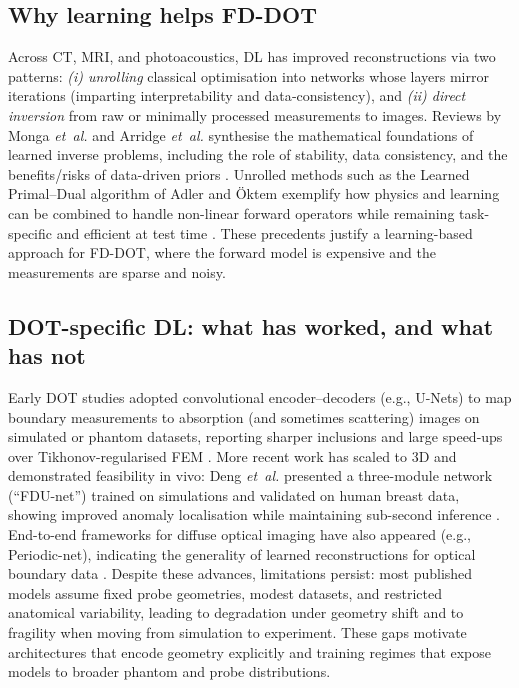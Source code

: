 \subsection{Why learning helps FD-DOT}
Across CT, MRI, and photoacoustics, DL has improved reconstructions via two patterns: \emph{(i) unrolling} classical optimisation into networks whose layers mirror iterations (imparting interpretability and data‐consistency), and \emph{(ii) direct inversion} from raw or minimally processed measurements to images. Reviews by Monga \emph{et~al.} and Arridge \emph{et~al.} synthesise the mathematical foundations of learned inverse problems, including the role of stability, data consistency, and the benefits/risks of data-driven priors \cite{monga2021, arridge2019}. Unrolled methods such as the Learned Primal–Dual algorithm of Adler and Öktem exemplify how physics and learning can be combined to handle non-linear forward operators while remaining task-specific and efficient at test time \cite{adler2018}. These precedents justify a learning-based approach for FD-DOT, where the forward model is expensive and the measurements are sparse and noisy.

\subsection{DOT-specific DL: what has worked, and what has not}
Early DOT studies adopted convolutional encoder–decoders (e.g., U-Nets) to map boundary measurements to absorption (and sometimes scattering) images on simulated or phantom datasets, reporting sharper inclusions and large speed-ups over Tikhonov-regularised FEM \cite{feng2020}. More recent work has scaled to 3D and demonstrated feasibility in vivo: Deng \emph{et~al.} presented a three-module network (“FDU-net”) trained on simulations and validated on human breast data, showing improved anomaly localisation while maintaining sub-second inference \cite{deng2023}. End-to-end frameworks for diffuse optical imaging have also appeared (e.g., Periodic-net), indicating the generality of learned reconstructions for optical boundary data \cite{murad2023}. Despite these advances, limitations persist: most published models assume fixed probe geometries, modest datasets, and restricted anatomical variability, leading to degradation under geometry shift and to fragility when moving from simulation to experiment. These gaps motivate architectures that encode geometry explicitly and training regimes that expose models to broader phantom and probe distributions.

